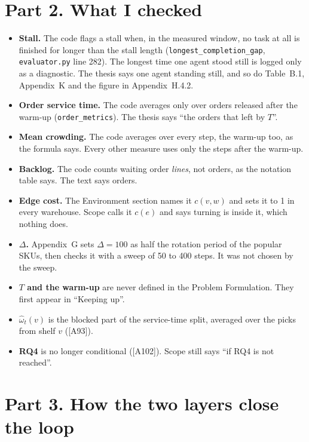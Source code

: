 \documentclass[11pt,a4paper]{article}
\begin{document}
\section*{Part 2. What I checked}
\begin{itemize}[nosep]
  \item \textbf{Stall.} The code flags a stall when, in the measured window,
        no task at all is finished for longer than the stall length
        (\texttt{longest\_completion\_gap}, \texttt{evaluator.py} line 282).
        The longest time one agent stood still is logged only as a
        diagnostic. The thesis says one agent standing still, and so do
        Table~B.1, Appendix~K and the figure in Appendix~H.4.2.
  \item \textbf{Order service time.} The code averages only over orders
        released after the warm-up (\texttt{order\_metrics}). The thesis
        says ``the orders that left by $T$''.
  \item \textbf{Mean crowding.} The code averages over every step, the
        warm-up too, as the formula says. Every other measure uses only the
        steps after the warm-up.
  \item \textbf{Backlog.} The code counts waiting order \emph{lines}, not
        orders, as the notation table says. The text says orders.
  \item \textbf{Edge cost.} The Environment section names it $c(v,w)$ and
        sets it to 1 in every warehouse. Scope calls it $c(e)$ and says
        turning is inside it, which nothing does.
  \item \textbf{$\Delta$.} Appendix~G sets $\Delta=100$ as half the rotation
        period of the popular SKUs, then checks it with a sweep of 50 to 400
        steps. It was not chosen by the sweep.
  \item \textbf{$T$ and the warm-up} are never defined in the Problem
        Formulation. They first appear in ``Keeping up''.
  \item \textbf{$\hat\omega_t(v)$} is the blocked part of the service-time
        split, averaged over the picks from shelf $v$ ([A93]).
  \item \textbf{RQ4} is no longer conditional ([A102]). Scope still says
        ``if RQ4 is not reached''.
\end{itemize}

\section*{Part 3. How the two layers close the loop}
\end{document}
